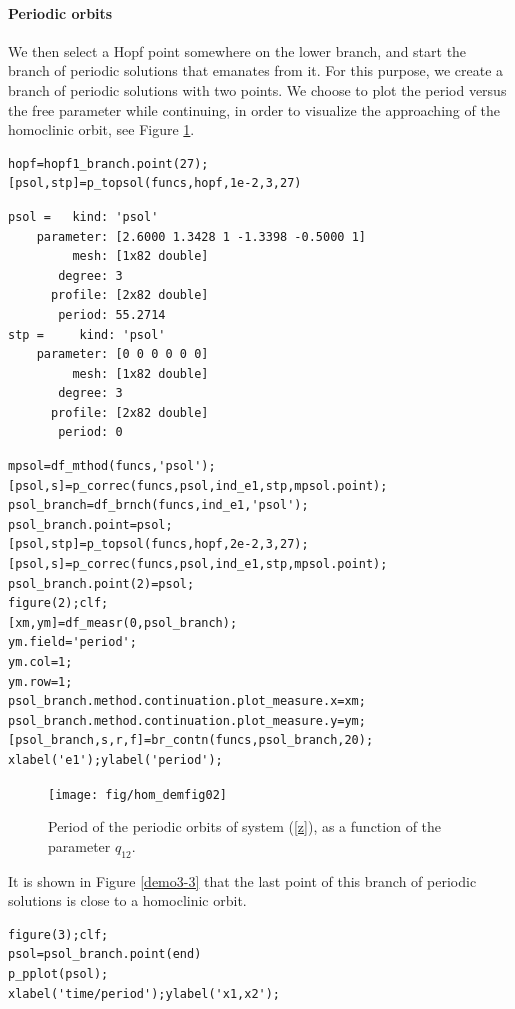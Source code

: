 \documentclass[10pt]{scrartcl}
\begin{document}
\paragraph{Periodic orbits}
We then select a Hopf point somewhere on the lower branch, and start
the branch of periodic solutions that emanates from it.  For this
purpose, we create a branch of periodic solutions with two points. We
choose to plot the period versus the free parameter while continuing,
in order to visualize the approaching of the homoclinic orbit, see
Figure \ref{demo3-2}.
\begin{lstlisting}
hopf=hopf1_branch.point(27);
[psol,stp]=p_topsol(funcs,hopf,1e-2,3,27)
\end{lstlisting}
{\small
\begin{verbatim}
psol =   kind: 'psol'
    parameter: [2.6000 1.3428 1 -1.3398 -0.5000 1]
         mesh: [1x82 double]
       degree: 3
      profile: [2x82 double]
       period: 55.2714
stp =     kind: 'psol'
    parameter: [0 0 0 0 0 0]
         mesh: [1x82 double]
       degree: 3
      profile: [2x82 double]
       period: 0
\end{verbatim}
}
\begin{lstlisting}
mpsol=df_mthod(funcs,'psol');
[psol,s]=p_correc(funcs,psol,ind_e1,stp,mpsol.point);
psol_branch=df_brnch(funcs,ind_e1,'psol');
psol_branch.point=psol;
[psol,stp]=p_topsol(funcs,hopf,2e-2,3,27);
[psol,s]=p_correc(funcs,psol,ind_e1,stp,mpsol.point);
psol_branch.point(2)=psol;
figure(2);clf;
[xm,ym]=df_measr(0,psol_branch);
ym.field='period';
ym.col=1;
ym.row=1;
psol_branch.method.continuation.plot_measure.x=xm;
psol_branch.method.continuation.plot_measure.y=ym;
[psol_branch,s,r,f]=br_contn(funcs,psol_branch,20);
xlabel('e1');ylabel('period');    
\end{lstlisting}
\begin{figure}[ht]
\begin{center}
\texttt{[image: fig/hom\_demfig02]}
\caption{\label{demo3-2}Period of the periodic orbits of system (\ref{z}), as a
 function of the parameter $q_{12}$.}
\end{center}
\end{figure}
It is shown in Figure \ref{demo3-3} that the last point of this branch
of periodic solutions is close to a homoclinic orbit.  
\begin{lstlisting}
figure(3);clf;
psol=psol_branch.point(end)
p_pplot(psol);
xlabel('time/period');ylabel('x1,x2');
\end{lstlisting}
\end{document}
